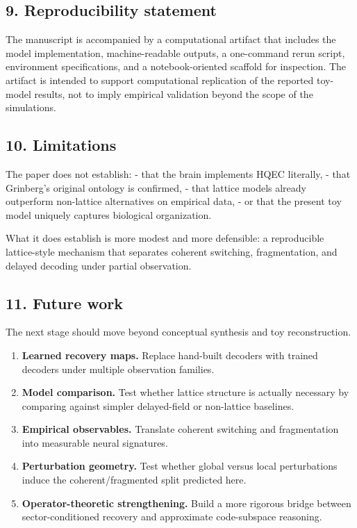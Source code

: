 \documentclass[
]{article}
\providecommand{\tightlist}{%
  \setlength{\itemsep}{0pt}\setlength{\parskip}{0pt}}
\begin{document}
\subsection{9. Reproducibility
statement}\label{reproducibility-statement}

The manuscript is accompanied by a computational artifact that includes
the model implementation, machine-readable outputs, a one-command rerun
script, environment specifications, and a notebook-oriented scaffold for
inspection. The artifact is intended to support computational
replication of the reported toy-model results, not to imply empirical
validation beyond the scope of the simulations.

\subsection{10. Limitations}\label{limitations}

The paper does not establish: - that the brain implements HQEC
literally, - that Grinberg's original ontology is confirmed, - that
lattice models already outperform non-lattice alternatives on empirical
data, - or that the present toy model uniquely captures biological
organization.

What it does establish is more modest and more defensible: a
reproducible lattice-style mechanism that separates coherent switching,
fragmentation, and delayed decoding under partial observation.

\subsection{11. Future work}\label{future-work}

The next stage should move beyond conceptual synthesis and toy
reconstruction.

\begin{enumerate}
\def\labelenumi{\arabic{enumi}.}
\tightlist
\item
  \textbf{Learned recovery maps.} Replace hand-built decoders with
  trained decoders under multiple observation families.
\item
  \textbf{Model comparison.} Test whether lattice structure is actually
  necessary by comparing against simpler delayed-field or non-lattice
  baselines.
\item
  \textbf{Empirical observables.} Translate coherent switching and
  fragmentation into measurable neural signatures.
\item
  \textbf{Perturbation geometry.} Test whether global versus local
  perturbations induce the coherent/fragmented split predicted here.
\item
  \textbf{Operator-theoretic strengthening.} Build a more rigorous
  bridge between sector-conditioned recovery and approximate
  code-subspace reasoning.
\end{enumerate}
\end{document}
